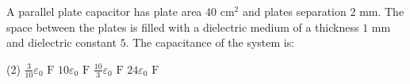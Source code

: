 \item A parallel plate capacitor has plate area \(40 \text{ cm}^2\) and plates separation \(2 \text{ mm}\). The space between the plates is filled with a dielectric medium of a thickness \(1 \text{ mm}\) and dielectric constant \(5\). The capacitance of the system is:
    \begin{tasks}(2)
        \task \(\frac{3}{10}\varepsilon_0 \text{ F}\)
        \task \(10 \varepsilon_0 \text{ F}\)
        \task \(\frac{10}{3} \varepsilon_0 \text{ F}\)
        \task \(24 \varepsilon_0 \text{ F}\)
    \end{tasks}